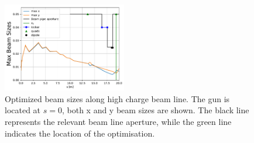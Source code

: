\begin{figure}
	\includegraphics[width=0.48\textwidth]{../pareto_stat_plots/xy-max-min-zrms_newobj}
	\caption{Optimized beam sizes along high charge beam line. The gun is located at $s=0$, 
	both x and y beam sizes are shown. The black line represents the relevant beam line aperture, while
	the green line indicates the location of the optimisation.}
	\label{fig:stat}
\end{figure}








